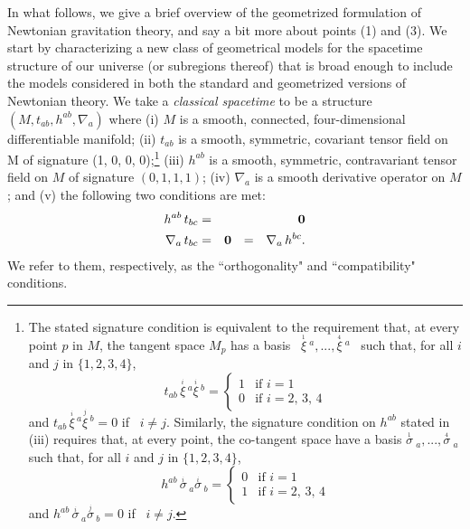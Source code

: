 \documentclass [12] {article}
\theoremstyle{plain}
\numberwithin{figure}{subsection}
\numberwithin{proposition}{subsection}
\begin{document}
In what follows, we give a brief overview of the geometrized formulation of Newtonian gravitation theory, and say a bit more about points (1) and (3).  We start by characterizing a new class of geometrical models for the spacetime structure of our universe (or subregions thereof) that is broad enough to include the models considered in both the standard and geometrized versions of Newtonian theory.  We take a \emph{classical spacetime} to be a structure  $(M, t_{ab}, h^{ab}, \nabla_a)$ where (i) $M$ is a smooth, connected, four-dimensional differentiable manifold; (ii) $t_{ab}$ is a smooth, symmetric, covariant tensor field on M of signature (1, 0, 0, 0);\footnote{The stated signature condition is equivalent to the requirement that, at every point $p$ in $M$, the tangent space $M_p$ has a basis \ $\overset{_1}{\xi} \ \! \!^a ,...,\overset{_4}{\xi} \ \!\!^a$  \ such that, for all $i$ and $j$ in $\{1,2,3,4\}$,
\[
t_{ab} \, \overset{_i}{\xi} \, \!^a  \overset{_i}{\xi} \,\!^b   = \left\{
\begin{array}{ll}
1 & \mbox{if  \ $i=1$}\\
0 & \mbox{if \  $i = 2, \, 3, \,  4$}
\end{array}
\right.
\]
and
$t_{ab} \, \overset{_i}{\xi} \, \!^a  \overset{_j}{\xi} \,\!^b   = 0$ if  \ $i\ne j$. Similarly, the signature condition on $h^{ab}$ stated in (iii) requires that, at every point, the co-tangent space have a basis $\overset{_1}{\sigma} \ \! \!_a ,...,
\overset{_4}{\sigma} \ \!\!_a$  such that, for all $i$ and $j$ in $\{1,2,3,4\}$,
\[
h^{ab} \, \overset{_i}{\sigma} \, \!_a  \overset{_i}{\sigma} \,\!_b   = \left\{
\begin{array}{ll}
0 & \mbox{if  \ $i=1$}\\
1 & \mbox{if \  $i = 2, \, 3, \,  4$}
\end{array}
\right.
\]
and
$h^{ab} \, \overset{_i}{\sigma} \, \!_a  \overset{_j}{\sigma} \,\!_b   = 0$ if  \ $i\ne j$.} (iii) $h^{ab}$ is a smooth, symmetric, contravariant tensor field on $M$ of signature $(0,1, 1, 1)$;   (iv) $\nabla_a$  is a smooth derivative operator on $M$; and (v) the following two conditions are met:
%
\begin{eqnarray}
h^{ab} \, t_{bc} &=& \mathbf{0}  \label{orthogonality condition}  \\
\nabla_a \,  t_{bc} &=& \textbf{0}   \hspace{.7em}     = \hspace{.7em}  \nabla_a \, h^{bc} .    \label{compatibility condition}
\end{eqnarray}
We refer to them, respectively, as the ``orthogonality" and ``compatibility" conditions.
\end{document}
